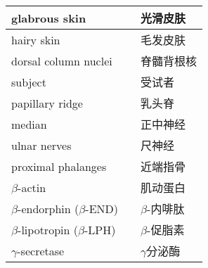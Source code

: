 \begin{longtable}{lll}
	\midrule
	glabrous skin && 光滑皮肤 \\
	
	\midrule
	hairy skin && 毛发皮肤 \\
	
	\midrule
	dorsal column nuclei  && 脊髓背根核
	\\
	
	\midrule
	subject  && 受试者
	\\
	
	\midrule
	papillary ridge  && 乳头脊
	\\
	
	\midrule
	median  && 正中神经
	\\
	
	\midrule
	ulnar nerves  && 尺神经
	\\
	
	\midrule
	proximal phalanges  && 近端指骨
	\\
	
	\midrule
	$\beta$-actin && 肌动蛋白  \\
	
	\midrule
	$\beta$-endorphin ($\beta$-END) && $\beta$-内啡肽  \\
	
	\midrule
	$\beta$-lipotropin ($\beta$-LPH) && $\beta$-促脂素  \\
	
	\midrule
	$\gamma$-secretase && $\gamma$分泌酶  \\
	
	
	\bottomrule  

\end{longtable}

